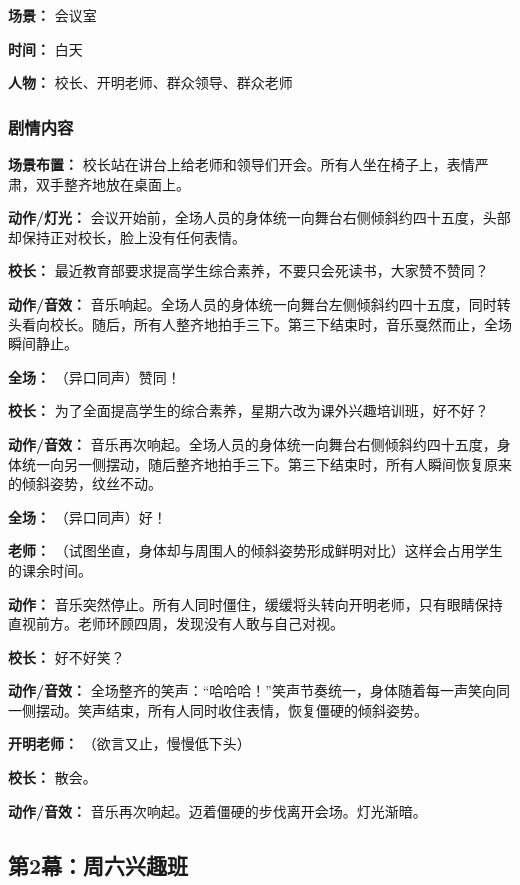 \documentclass[11pt, a4paper]{article}
\begin{document}
	\textbf{场景：} 会议室
	
	\textbf{时间：} 白天
	
	\textbf{人物：} 校长、开明老师、群众领导、群众老师
	
	\subsubsection{剧情内容}
	
	\textbf{场景布置：}
	校长站在讲台上给老师和领导们开会。所有人坐在椅子上，表情严肃，双手整齐地放在桌面上。
	
	\textbf{动作/灯光：}
	会议开始前，全场人员的身体统一向舞台右侧倾斜约四十五度，头部却保持正对校长，脸上没有任何表情。
	
	\textbf{校长：}
	最近教育部要求提高学生综合素养，不要只会死读书，大家赞不赞同？
	
	\textbf{动作/音效：}
	音乐响起。全场人员的身体统一向舞台左侧倾斜约四十五度，同时转头看向校长。随后，所有人整齐地拍手三下。第三下结束时，音乐戛然而止，全场瞬间静止。
	
	\textbf{全场：} （异口同声）赞同！
	
	\textbf{校长：}
	为了全面提高学生的综合素养，星期六改为课外兴趣培训班，好不好？
	
	\textbf{动作/音效：}
	音乐再次响起。全场人员的身体统一向舞台右侧倾斜约四十五度，身体统一向另一侧摆动，随后整齐地拍手三下。第三下结束时，所有人瞬间恢复原来的倾斜姿势，纹丝不动。
	
	\textbf{全场：} （异口同声）好！
	
	\textbf{老师：}
	（试图坐直，身体却与周围人的倾斜姿势形成鲜明对比）这样会占用学生的课余时间。
	
	\textbf{动作：}
	音乐突然停止。所有人同时僵住，缓缓将头转向开明老师，只有眼睛保持直视前方。老师环顾四周，发现没有人敢与自己对视。
	
	\textbf{校长：}
	好不好笑？
	
	\textbf{动作/音效：}
	全场整齐的笑声：“哈哈哈！”笑声节奏统一，身体随着每一声笑向同一侧摆动。笑声结束，所有人同时收住表情，恢复僵硬的倾斜姿势。
	
	\textbf{开明老师：}
	（欲言又止，慢慢低下头）
	
	\textbf{校长：}
	散会。
	
	\textbf{动作/音效：}
	音乐再次响起。迈着僵硬的步伐离开会场。灯光渐暗。
	
	\newpage
	
	\subsection{第2幕：周六兴趣班}
	
\end{document}
